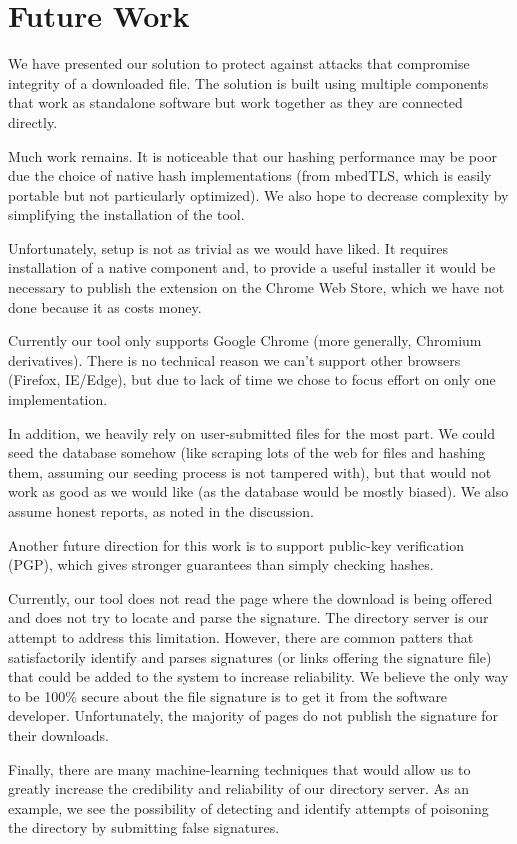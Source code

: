 \documentclass[letterpaper,twocolumn,10pt]{article}
\begin{document}
\section{Future Work}

We have presented our solution to protect against attacks that compromise integrity of a downloaded file. The solution is built using multiple components that work as standalone software but work together as they are connected directly.

Much work remains. It is noticeable that our hashing performance may be poor due the choice of native hash implementations (from mbedTLS, which is easily portable but not particularly optimized). We also hope to decrease complexity by simplifying the installation of the tool. 

Unfortunately, setup is not as trivial as we would have liked. It requires installation of a native component and, to provide a useful installer it would be necessary to publish the extension on the Chrome Web Store, which we have not done because it as costs money.

Currently our tool only supports Google Chrome (more generally, Chromium derivatives). There is no technical reason we can't support other browsers (Firefox, IE/Edge), but due to lack of time we chose to focus effort on only one implementation.

In addition, we heavily rely on user-submitted files for the most part. We could seed the database somehow (like scraping lots of the web for files and hashing them, assuming our seeding process is not tampered with), but that would not work as good as we would like (as the database would be mostly biased). We also assume honest reports, as noted in the discussion.

Another future direction for this work is to support public-key verification (PGP), which gives stronger guarantees than simply checking hashes.

Currently, our tool does not read the page where the download is being offered and does not try to locate and parse the signature. The directory server is our attempt to address this limitation. However, there are common patters that satisfactorily identify and parses signatures (or links offering the signature file) that could be added to the system to increase reliability. We believe the only way to be 100\% secure about the file signature is to get it from the software developer. Unfortunately, the majority of pages do not publish the signature for their downloads.

Finally, there are many machine-learning techniques that would allow us to greatly increase the credibility and reliability of our directory server. As an example, we see the possibility of detecting and identify attempts of poisoning the directory by submitting false signatures.

{\footnotesize 
}
\end{document}
